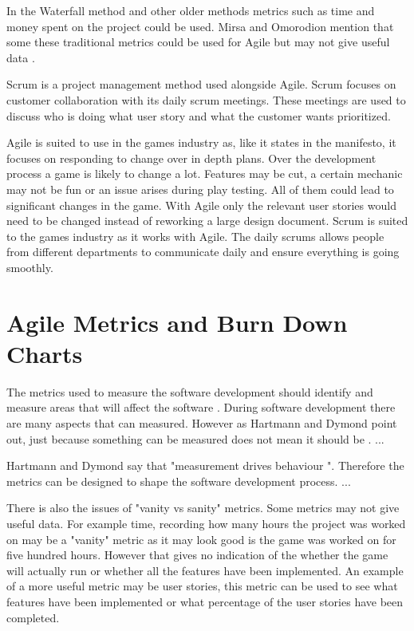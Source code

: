 \documentclass{scrartcl}
\begin{document}
In the Waterfall method and other older methods metrics such as time and money spent on the project could be used. Mirsa and Omorodion mention that some these traditional metrics could be used for Agile but may not give useful data \cite{Misra}.

Scrum is a project management method used alongside Agile. Scrum focuses on customer collaboration with its daily scrum meetings. These meetings are used to discuss who is doing what user story and what the customer wants prioritized. 

Agile is suited to use in the games industry as, like it states in the manifesto, it focuses on responding to change over in depth plans. Over the development process a game is likely to change a lot. Features may be cut, a certain mechanic may not be fun or an issue arises during play testing. All of them could lead to significant changes in the game. With Agile only the relevant user stories would need to be changed instead of reworking a large design document. Scrum is suited to the games industry as it works with Agile. The daily scrums allows people from different departments to communicate daily and ensure everything is going smoothly.


\section{Agile Metrics and Burn Down Charts}

The metrics used to measure the software development should identify and measure areas that will affect the software \cite{Misra}.
During software development there are many aspects that can measured. However as Hartmann and Dymond point out, just because something can be measured does not mean it should be \cite{Hartmann}. ...

Hartmann and Dymond say that "measurement drives behaviour ". Therefore the metrics can be designed to shape the software development process. ...

There is also the issues of "vanity vs sanity" metrics. Some metrics may not give useful data. For example time, recording how many hours the project was worked on may be a "vanity" metric as it may look good is the game was worked on for five hundred hours. However that gives no indication of the whether the game will actually run or whether all the features have been implemented. An example of a more useful metric may be user stories, this metric can be used to see what features have been implemented or what percentage of the user stories have been completed.
\end{document}

